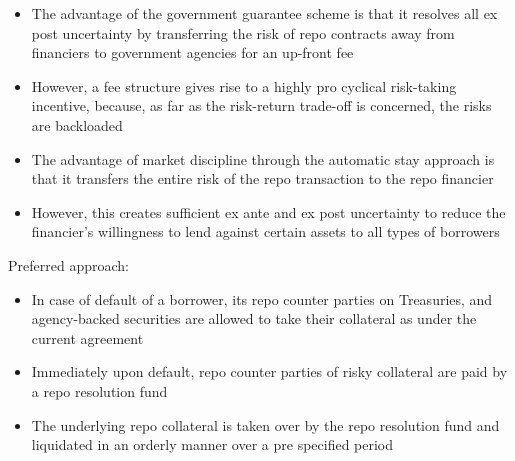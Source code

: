 \documentclass[11pt]{beamer}
\begin{document}
\begin{frame}
\begin{itemize}
\item The advantage of the government guarantee scheme is that it resolves all ex post uncertainty by transferring the risk of repo contracts away from financiers to government agencies for an up-front fee
\item However, a fee structure gives rise to a highly pro cyclical risk-taking incentive, because, as far as the risk-return trade-off is concerned, the risks are backloaded
\item The advantage of market discipline through the automatic stay approach is that it transfers the entire risk of the repo transaction to the repo financier
\item However, this creates sufficient ex ante and ex post uncertainty to reduce the financier’s willingness to lend against certain assets to all types of borrowers
\end{itemize}
\end{frame}

\begin{frame}
Preferred approach:
\begin{itemize}
\item In case of default of a borrower, its repo counter parties on Treasuries, and agency-backed securities are allowed to take their collateral as under the current agreement
\item Immediately upon default, repo counter parties of risky collateral are paid by a repo resolution fund
\item The underlying repo collateral is taken over by the repo resolution fund and liquidated in an orderly manner over a pre specified period
\end{itemize}
\end{frame}
\end{document}
